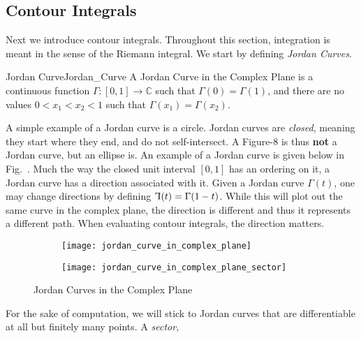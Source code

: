 \subsection{Contour Integrals}
    Next we introduce contour integrals. Throughout this section,
    integration is meant in the sense of the Riemann integral.
    We start by defining \textit{Jordan Curves}.
    \begin{ldefinition}{Jordan Curve}{Jordan_Curve}
        A Jordan Curve in the Complex Plane is a continuous function
        $\Gamma:[0,1]\rightarrow\mathbb{C}$ such that
        $\Gamma(0)=\Gamma(1)$, and there are no values $0<x_{1}<x_{2}<1$
        such that $\Gamma(x_{1})=\Gamma(x_{2})$.
    \end{ldefinition}
    A simple example of a Jordan curve is a circle. Jordan curves are
    \textit{closed}, meaning they start where they end, and do not
    self-intersect. A Figure-8 is thus \textbf{not} a Jordan curve, but
    an ellipse is. An example of a Jordan curve is given below in
    Fig.~. Much the way
    the closed unit interval $[0,1]$ has an ordering on it, a Jordan
    curve has a direction associated with it. Given a Jordan curve
    $\Gamma(t)$, one may change directions by defining
    $\reflectbox{\ensuremath{\Gamma}}(t)=\Gamma(1-t)$.
    While this will plot out the same curve in the complex plane, the
    direction is different and thus it represents a different path. When
    evaluating contour integrals, the direction matters.
    \begin{figure}[H]
        \captionsetup{type=figure}
        \centering
        \begin{subfigure}[b]{0.49\textwidth}
            \centering
            \texttt{[image: jordan\_curve\_in\_complex\_plane]}
            \label{fig:Ex_of_Smooth_Jordan_Curve}
        \end{subfigure}
        \begin{subfigure}[b]{0.49\textwidth}
            \centering
            \texttt{[image: jordan\_curve\_in\_complex\_plane\_sector]}
            \label{fig:Ex_of_Jordan_Curve_Sector}
        \end{subfigure}
        \caption{Jordan Curves in the Complex Plane}
        \label{fig:Ex_of_Jordan_Curve}
    \end{figure}
    For the sake of computation, we will stick to Jordan curves that are
    differentiable at all but finitely many points. A \textit{sector},
